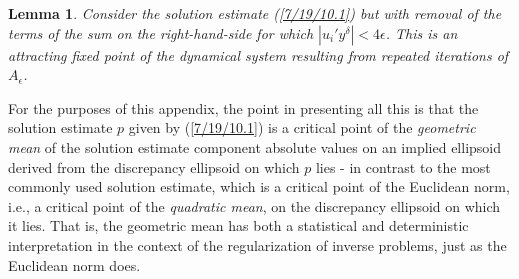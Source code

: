 \documentclass{amsart}
\numberwithin{equation}{section}
\newtheorem{lemma}[theorem]{Lemma}
\theoremstyle{definition}
\numberwithin{theorem}{section}
\begin{document}
{\begin{lemma} \label{7/6/21.9} Consider the solution estimate (\ref{7/19/10.1}) but with removal of the terms of the sum on the right-hand-side for which $|u_i'y^\delta|<4\epsilon$.  This is an attracting fixed point of the dynamical system resulting from repeated iterations of $A_\epsilon$. \end{lemma}



For the purposes of this appendix, the point in presenting all this is that the solution estimate $p$ given by (\ref{7/19/10.1}) is a critical point of the {\it geometric mean} of the solution estimate component absolute values on an implied ellipsoid  derived from the discrepancy ellipsoid on which $p$ lies - in contrast to the most commonly used solution estimate, which is a critical point of the Euclidean norm, i.e., a critical point of the {\it quadratic mean}, on the discrepancy ellipsoid on which it lies.  That is, the geometric mean has both a statistical and deterministic interpretation in the context of the regularization of inverse problems, just as the Euclidean norm does. 
 
}
\end{document}
